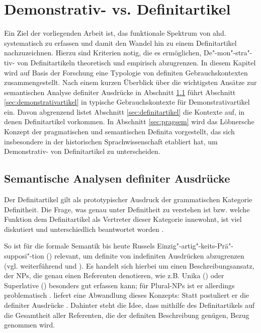 \chapter{Demonstrativ- vs. Definitartikel}\label{chap:demdef}

Ein Ziel der vorliegenden Arbeit ist, das funktionale Spektrum von ahd.  systematisch zu erfassen und damit den Wandel hin zu einem Definitartikel nachzuzeichnen. Hierzu sind  Kriterien notig, die es ermöglichen, De"-mon"-stra"-tiv- von Definitartikeln theoretisch und empirisch  abzugrenzen. In diesem Kapitel wird auf Basis der Forschung eine Typologie von definiten Gebrauchskontexten zusammengestellt. Nach einem kurzen Überblick über die wichtigsten Ansätze zur semantischen Analyse definiter Ausdrücke in Abschnitt \ref{sec:definitheitstheorien} führt Abschnitt \ref{sec:demonstrativartikel} in typische Gebrauchskontexte für Demonstrativartikel ein. Davon abgrenzend listet Abschnitt \ref{sec:definitartikel} die Kontexte auf, in denen Definitartikel vorkommen. In Abschnitt \ref{sec:pragsem} wird das  Löbnersche Konzept der pragmatischen und semantischen Definita vorgestellt, das sich insbesondere in der historischen Sprachwissenschaft etabliert hat, um Demonstrativ- von Definitartikel zu unterscheiden. 

\section{Semantische Analysen definiter Ausdrücke} \label{sec:definitheitstheorien}

Der Definitartikel gilt als prototypischer Ausdruck der grammatischen Kategorie Definitheit. Die Frage, was genau unter Definitheit zu verstehen ist bzw. welche Funktion dem Definitartikel als Vertreter dieser Kategorie innewohnt, ist viel diskutiert und unterschiedlich beantwortet worden \parencite[zum Überblick  s.][]{Bisle-Muller1991,Hauenschild1993,Lyons1999,Abbott2007,Cui2014}.

So ist für die formale Semantik bis heute Russels Einzig"-artig"-keits-Prä"-supposi"-tion () relevant, um definite von indefiniten Ausdrücken abzugrenzen (vgl. weiterführend \citealt{Russel1905} und \citealt{Heim1991,Heim2011}). Es handelt sich hierbei um einen Beschreibungsansatz, der NPs, die genau einen Referenten denotieren, wie z.B. Unika () oder Superlative () besonders gut erfassen kann; für  Plural-NPs  ist er allerdings problematisch \parencite[vgl. die Diskussion hierzu in][7--11] {Lyons1999}. \textcite{Hawkins1978} liefert eine Abwandlung dieses Konzepts: Statt  postuliert er die  definiter Ausdrücke  \parencite[kritisch hierzu:][32]{Bisle-Muller1991}. Dahinter steht die Idee, dass mithilfe des Definitartikels auf die Gesamtheit aller Referenten, die der definiten Beschreibung genügen, Bezug genommen wird.

